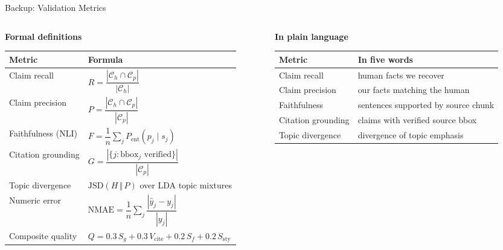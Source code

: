 \documentclass[aspectratio=169, 11pt]{beamer}
\begin{document}
\begin{frame}{Backup: Validation Metrics}
\color{ornlgrey!90}
\scriptsize
\renewcommand{\arraystretch}{1.3}
\setlength\tabcolsep{4pt}
\begin{columns}[T]
  \begin{column}{0.56\textwidth}
    \textbf{Formal definitions}\\[3pt]
    \begin{tabular}{@{}p{2.2cm}p{5.4cm}@{}}
    \toprule
    \textbf{Metric} & \textbf{Formula}\\
    \midrule
    Claim recall &
      $R = \dfrac{|\mathcal{C}_h \cap \mathcal{C}_p|}{|\mathcal{C}_h|}$\\[6pt]
    Claim precision &
      $P = \dfrac{|\mathcal{C}_h \cap \mathcal{C}_p|}{|\mathcal{C}_p|}$\\[6pt]
    Faithfulness (NLI) &
      $F = \dfrac{1}{n}\displaystyle\sum_{j} P_{\text{ent}}(p_j \mid s_j)$\\[6pt]
    Citation grounding &
      $G = \dfrac{|\{j : \text{bbox}_j \text{ verified}\}|}{|\mathcal{C}_p|}$\\[6pt]
    Topic divergence &
      $\text{JSD}(H \,\Vert\, P)$ over LDA topic mixtures\\[2pt]
    Numeric error &
      $\text{NMAE} = \dfrac{1}{n}\displaystyle\sum_{j}\dfrac{|\hat y_j - y_j|}{|y_j|}$\\[6pt]
    Composite quality &
      $Q = 0.3\,S_g + 0.3\,V_{\text{cite}} + 0.2\,S_f + 0.2\,S_{\text{sty}}$\\
    \bottomrule
    \end{tabular}
  \end{column}
  \begin{column}{0.42\textwidth}
    \textbf{In plain language}\\[3pt]
    \begin{tabular}{@{}p{2.2cm}p{3.8cm}@{}}
    \toprule
    \textbf{Metric} & \textbf{In five words}\\
    \midrule
    Claim recall      & human facts we recover\\[2pt]
    Claim precision   & our facts matching the human\\[2pt]
    Faithfulness      & sentences supported by source chunk\\[2pt]
    Citation grounding& claims with verified source bbox\\[2pt]
    Topic divergence  & divergence of topic emphasis\\[2pt]

\end{tabular}
\end{column}
\end{columns}
\end{frame}
\end{document}
